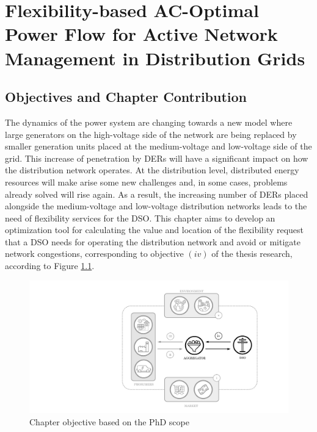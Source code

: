 \chapter{Flexibility-based AC-Optimal Power Flow for Active Network Management in Distribution Grids}
\label{ChapterOPFDSO}

\section{Objectives and Chapter Contribution}

The dynamics of the power system are changing towards a new model where large generators on the high-voltage side of the network are being replaced by smaller generation units placed at the medium-voltage and low-voltage side of the grid. This increase of penetration by DERs will have a significant impact on how the distribution network operates. At the distribution level, distributed energy resources will make arise some new challenges and, in some cases, problems already solved will rise again. As a result, the increasing number of DERs placed alongside the medium-voltage  and low-voltage distribution networks leads to the need of flexibility services for the DSO. 
This chapter aims to develop an optimization tool for calculating the value and location of the flexibility request that a DSO needs for operating the distribution network and avoid or mitigate network congestions, corresponding to objective $(iv)$ of the thesis research, according to Figure \ref{fig:chapter_obj_iv}. 

\begin{figure}[htbp]
	\centering
	\includegraphics[width=0.7\columnwidth ]{ChapterOPF_DSO/Figures/phd_intro_iv.pdf}
		\caption{Chapter objective based on the PhD scope}
	\label{fig:chapter_obj_iv}  
\end{figure}


